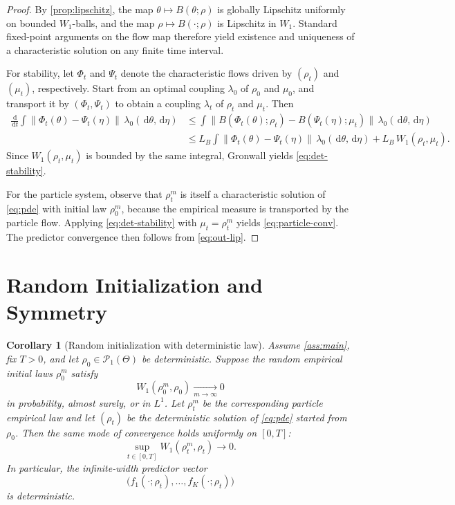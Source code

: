 \documentclass[11pt]{article}
\newtheorem{corollary}[theorem]{Corollary}
\theoremstyle{definition}
\newcommand{\PP}{\mathcal{P}}
\newcommand{\W}{W_1}
\newcommand{\dd}{\,\mathrm{d}}
\begin{document}
\begin{proof}
By \cref{prop:lipschitz}, the map $\theta\mapsto B(\theta;\rho)$ is globally
Lipschitz uniformly on bounded $\W$-balls, and the map $\rho\mapsto B(\cdot;\rho)$
is Lipschitz in $\W$. Standard fixed-point arguments on the flow map therefore
yield existence and uniqueness of a characteristic solution on any finite time
interval.

For stability, let $\Phi_t$ and $\Psi_t$ denote the characteristic flows driven
by $(\rho_t)$ and $(\mu_t)$, respectively. Start from an optimal coupling
$\lambda_0$ of $\rho_0$ and $\mu_0$, and transport it by
$(\Phi_t,\Psi_t)$ to obtain a coupling $\lambda_t$ of $\rho_t$ and $\mu_t$.
Then
\begin{align*}
  \frac{\dd}{\dd t}
  \int \|\Phi_t(\theta)-\Psi_t(\eta)\|\,\lambda_0(\dd\theta,\dd\eta)
  &\le
  \int
    \|B(\Phi_t(\theta);\rho_t)-B(\Psi_t(\eta);\mu_t)\|
    \,\lambda_0(\dd\theta,\dd\eta) \\
  &\le
  L_B
  \int
    \|\Phi_t(\theta)-\Psi_t(\eta)\|
    \,\lambda_0(\dd\theta,\dd\eta)
  +
  L_B\,\W(\rho_t,\mu_t).
\end{align*}
Since $\W(\rho_t,\mu_t)$ is bounded by the same integral, Gronwall yields
\eqref{eq:det-stability}.

For the particle system, observe that $\rho_t^m$ is itself a characteristic
solution of \cref{eq:pde} with initial law $\rho_0^m$, because the empirical
measure is transported by the particle flow. Applying \eqref{eq:det-stability}
with $\mu_t=\rho_t^m$ yields \eqref{eq:particle-conv}. The predictor convergence
then follows from \eqref{eq:out-lip}.
\end{proof}

\section{Random Initialization and Symmetry}

\begin{corollary}[Random initialization with deterministic law]
\label{cor:random}
Assume \cref{ass:main}, fix $T>0$, and let $\rho_0\in\PP_1(\Theta)$ be
deterministic. Suppose the random empirical initial laws $\rho_0^m$ satisfy
\[
  \W(\rho_0^m,\rho_0)\xrightarrow[m\to\infty]{}0
\]
in probability, almost surely, or in $L^1$. Let $\rho_t^m$ be the corresponding
particle empirical law and let $(\rho_t)$ be the deterministic solution of
\cref{eq:pde} started from $\rho_0$. Then the same mode of convergence holds
uniformly on $[0,T]$:
\[
  \sup_{t\in[0,T]}\W(\rho_t^m,\rho_t)\to 0.
\]
In particular, the infinite-width predictor vector
\[
  \bigl(f_1(\cdot;\rho_t),\dots,f_K(\cdot;\rho_t)\bigr)
\]
is deterministic.
\end{corollary}
\end{document}
